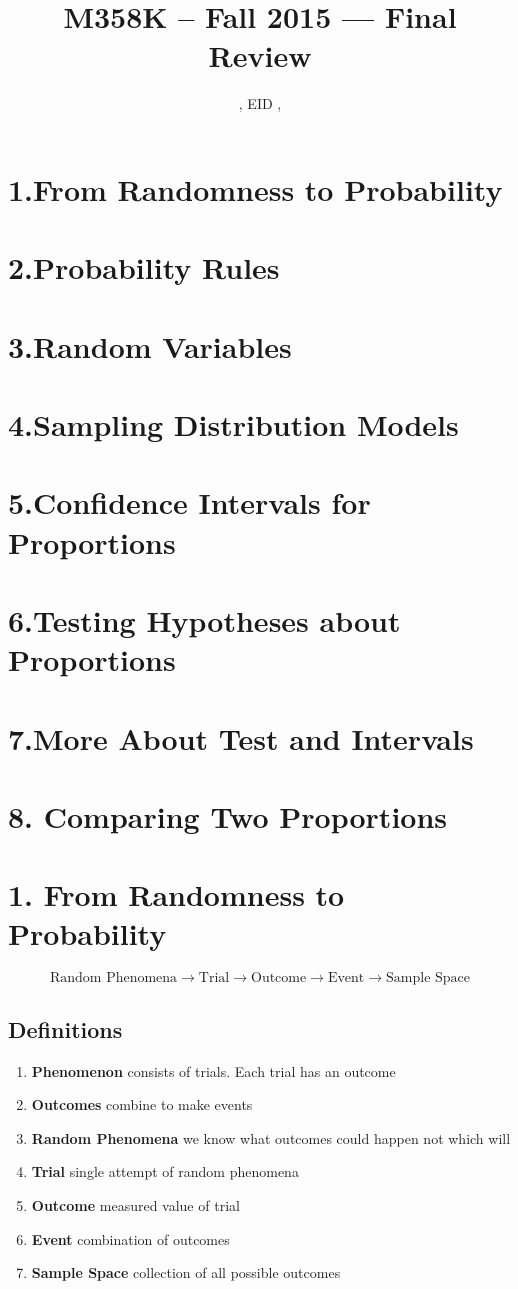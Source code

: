 \documentclass[11pt]{article}
\title{M358K -- Fall 2015 --- Final Review \Review}
\author{\Name, EID \EID, \texttt{\Login}}
\date{}
\begin{document}
\maketitle
\section*{1.From Randomness to Probability}
\section*{2.Probability Rules}
\section*{3.Random Variables}
\section*{4.Sampling Distribution Models}
\section*{5.Confidence Intervals for Proportions}
\section*{6.Testing Hypotheses about Proportions}
\section*{7.More About Test and Intervals}
\section*{8. Comparing Two Proportions}

\newpage
\section*{1. From Randomness to Probability}
{\Large{$$\text{Random Phenomena} \rightarrow \text{Trial} \rightarrow \text{Outcome} \rightarrow \text{Event} \rightarrow \text{Sample Space}$$}}
 \renewcommand{\labelenumii}{\Roman{enumii}}
   \subsection*{Definitions}
   \begin{enumerate}
     \item \textbf{Phenomenon} consists of trials. Each trial has an outcome
     \item \textbf{Outcomes} combine to make events
     \item \textbf{Random Phenomena} we know what outcomes could happen not which will
     \item \textbf{Trial} single attempt of random phenomena
     \item \textbf{Outcome} measured value of trial
     \item \textbf{Event} combination of outcomes
     \item \textbf{Sample Space} collection of all possible outcomes
   \end{enumerate}
   
\end{document}
